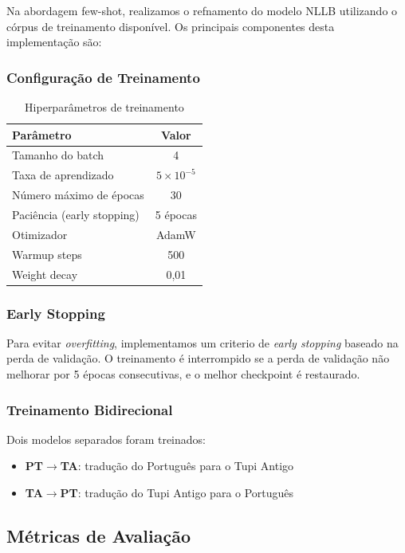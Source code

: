 \documentclass[12pt,a4paper]{article}
\begin{document}
Na abordagem few-shot, realizamos o refnamento do modelo NLLB utilizando o córpus de treinamento disponível. Os principais componentes desta implementação são:

\subsubsection{Configuração de Treinamento}

\begin{table}[H]
\centering
\caption{Hiperparâmetros de treinamento}
\begin{tabular}{lc}
\toprule
\textbf{Parâmetro} & \textbf{Valor} \\
\midrule
Tamanho do batch & 4 \\
Taxa de aprendizado & $5 \times 10^{-5}$ \\
Número máximo de épocas & 30 \\
Paciência (early stopping) & 5 épocas \\
Otimizador & AdamW \\
Warmup steps & 500 \\
Weight decay & 0,01 \\
\bottomrule
\end{tabular}
\label{tab:hyperparams}
\end{table}

\subsubsection{Early Stopping}

Para evitar \textit{overfitting}, implementamos um criterio de \textit{early stopping} baseado na perda de validação. O treinamento é interrompido se a perda de validação não melhorar por 5 épocas consecutivas, e o melhor checkpoint é restaurado.

\subsubsection{Treinamento Bidirecional}

Dois modelos separados foram treinados:
\begin{itemize}
    \item \textbf{PT$\rightarrow$TA}: tradução do Português para o Tupi Antigo
    \item \textbf{TA$\rightarrow$PT}: tradução do Tupi Antigo para o Português
\end{itemize}

\subsection{Métricas de Avaliação}
\end{document}
